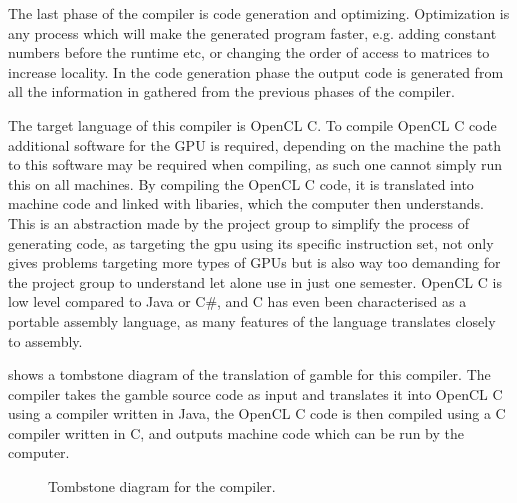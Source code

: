 The last phase of the compiler is code generation and optimizing.
Optimization is any process which will make the generated program faster, e.g. adding constant numbers before the runtime etc, or changing the order of access to matrices to increase locality. 
In the code generation phase the output code is generated from all the information in gathered from the previous phases of the compiler.

The target language of this compiler is OpenCL C.
To compile OpenCL C code additional software for the GPU is required, depending on the machine the path to this software may be required when compiling, as such one cannot simply run this on all machines.
By compiling the OpenCL C code, it is translated into machine code and linked with libaries, which the computer then understands.
This is an abstraction made by the project group to simplify the process of generating code, as targeting the \acrshort{gpu} using its specific instruction set, not only gives problems targeting more types of GPUs but is also way too demanding for the project group to understand let alone use in just one semester.
OpenCL C is low level compared to Java or C\#, and C has even been characterised as a portable assembly language, as many features of the language translates closely to assembly. \citep{CPort}

 shows a tombstone diagram of the translation of \gls{gamble} for this compiler.
The compiler takes the \gls{gamble} source code as input and translates it into OpenCL C using a compiler written in Java, the OpenCL C code is then compiled using a C compiler written in C, and outputs machine code which can be run by the computer.
\begin{figure}[!ht]
\centering
{}
\caption{Tombstone diagram for the compiler.}
\label{fig:tombstone}
\end{figure}



